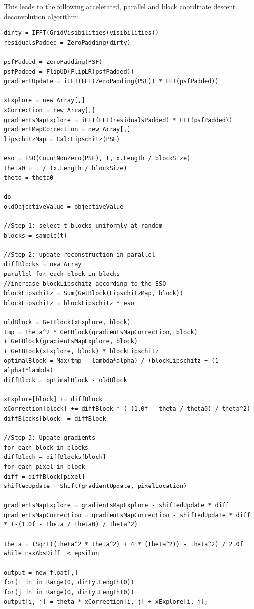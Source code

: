 This leads to the following accelerated, parallel and block coordinate descent deconvolution algorithm:
\begin{lstlisting}
dirty = IFFT(GridVisibilities(visibilities))
residualsPadded = ZeroPadding(dirty)

psfPadded = ZeroPadding(PSF)
psfPadded = FlipUD(FlipLR(psfPadded))
gradientUpdate = iFFT(FFT(ZeroPadding(PSF)) * FFT(psfPadded))

xExplore = new Array[,]
xCorrection = new Array[,]
gradientsMapExplore = iFFT(FFT(residualsPadded) * FFT(psfPadded))
gradientMapCorrection = new Array[,]
lipschitzMap = CalcLipschitz(PSF)

eso = ESO(CountNonZero(PSF), t, x.Length / blockSize)
theta0 = t / (x.Length / blockSize)
theta = theta0

do 
oldObjectiveValue = objectiveValue

//Step 1: select t blocks uniformly at random
blocks = sample(t)

//Step 2: update reconstruction in parallel
diffBlocks = new Array
parallel for each block in blocks
//increase blockLipschitz according to the ESO
blockLipschitz = Sum(GetBlock(LipschitzMap, block))
blockLipschitz = blockLipschitz * eso

oldBlock = GetBlock(xExplore, block)
tmp = theta^2 * GetBlock(gradientsMapCorrection, block) 
+ GetBlock(gradientsMapExplore, block) 
+ GetBLock(xExplore, block) * blockLipschitz
optimalBlock = Max(tmp - lambda*alpha) / (blockLipschitz + (1 - alpha)*lambda)
diffBlock = optimalBlock - oldBlock

xExplore[block] += diffBlock
xCorrection[block] += diffBlock * (-(1.0f - theta / theta0) / theta^2)
diffBlocks[block] = diffBlock

//Step 3: Update gradients
for each block in blocks
diffBlock = diffBlocks[block]
for each pixel in block
diff = diffBlock[pixel]
shiftedUpdate = Shift(gradientUpdate, pixelLocation)

gradientsMapExplore = gradientsMapExplore - shiftedUpdate * diff
gradientsMapCorrection = gradientsMapCorrection - shiftedUpdate * diff * (-(1.0f - theta / theta0) / theta^2)

theta = (Sqrt((theta^2 * theta^2) + 4 * (theta^2)) - theta^2) / 2.0f
while maxAbsDiff  < epsilon

output = new float[,]
for(i in in Range(0, dirty.Length(0))
for(j in in Range(0, dirty.Length(0))
output[i, j] = theta * xCorrection[i, j] + xExplore[i, j];
\end{lstlisting}

